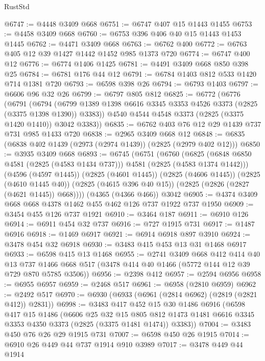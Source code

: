 \begin{lexlean}{RustStd}
\begin{coremodule}
@6747 := @4448 @3409 @668
@6751 := @6747 @407 @15 @1443 @1455
@6753 := @4458 @3409 @668
@6760 := @6753 @396 @406 @40 @15 @1443 @1453 @1445
@6762 := @4471 @3409 @668
@6763 := @6762 @400
@6772 := @6763 @405 @12 @39 @1427 @1442 @1452 @985 @1373 @720
@6774 := @6747 @400 @12
@6776 := @6774 @1406 @1425
@6781 := @4491 @3409 @668 @850 @398 @25
@6784 := @6781 @176 @44 @12
@6791 := @6784 @1403 @812 @533 @1420 @714 @1381 @720
@6793 := @6598 @398 @26
@6794 := @6793 @1403
@6797 := @6606 @96 @32 @26
@6799 := @6797 @805 @812
@6825 := @6772
    (@6776
      (@6791
        (@6794 (@6799 @1389 @1398 @6616 @3345 @3353 @4526 @3373 (@2825 (@3375 @1398 @1390)) @3383))
        @4540
        @4544
        @4548
        @3373
        (@2825 (@3375 @1420 @1410))
        @3042
        @3383))
@6835 := @6762 @403 @76 @12 @29 @1439 @737 @731 @985 @1433 @720
@6838 := @2965 @3409 @668 @12
@6848 := @6835 (@6838 @402 @1439 (@2973 (@2974 @1439)) (@2825 (@2979 @402 @12)))
@6850 := @3935 @3409 @668
@6893 := @6745
    (@6751
      (@6760
        (@6825 (@6848 @6850 @4581 (@2825 (@4583 @1434 @737))) @4581 (@2825 (@4583 @1374 @1442)))
        (@4596 (@4597 @1445))
        (@2825 (@4601 @1445))
        (@2825 (@4606 @1445))
        (@2825 (@4610 @1445 @40))
        (@2825 (@4615 @396 @40 @15))
        (@2825 (@2826 (@2827 (@4621 @1445)) @668))))
    (@4365 (@4366 @466))
    @3042
@6905 := @4374 @3409 @668 @668 @4378 @1462 @455 @462 @126 @737 @1922 @737 @1950
@6909 := @3454 @455 @126 @737 @1921
@6910 := @3464 @187
@6911 := @6910 @126
@6914 := @6911 @454 @32 @737
@6916 := @727 @1915 @731
@6917 := @1487 @6916
@6918 := @1469 @6917
@6921 := @6914 @6918 @897 @3910
@6924 := @3478 @454 @32 @6918
@6930 := @3483 @415 @453 @13 @31 @1468 @6917
@6933 := @6598 @415 @13 @1468
@6955 := @2741
    @3409
    @668
    @412
    @414
    @40
    @13
    @737
    @1466
    @668
    @517
    (@3478 @414 @40 @1466 (@5772 @144 @12 @39 @729 @870 @5785 @3506))
@6956 := @2398 @412
@6957 := @2594 @6956
@6958 := @6955 @6957
@6959 := @2468 @517
@6961 := @6958 (@2810 @6959)
@6962 := @2492 @517
@6970 := @6930 (@6933 (@6961 (@2814 @6962) (@2819 (@2821 @412)) @2831))
@6998 := @3483
    @417
    @452
    @15
    @30
    @1486
    @6916
    (@6598
      @417
      @15
      @1486
      (@6606
        @25
        @32
        @15
        @805
        @812
        @1473
        @1481
        @6616
        @3345
        @3353
        @4350
        @3373
        (@2825 (@3375 @1481 @1474))
        @3383))
@7004 := @3483 @450 @76 @26 @29 @1915 @731
@7007 := @6598 @450 @26 @1915
@7014 := @6910 @26 @449 @44 @737 @1914 @910 @3989
@7017 := @3478 @449 @44 @1914

\end{coremodule}
\end{lexlean}
